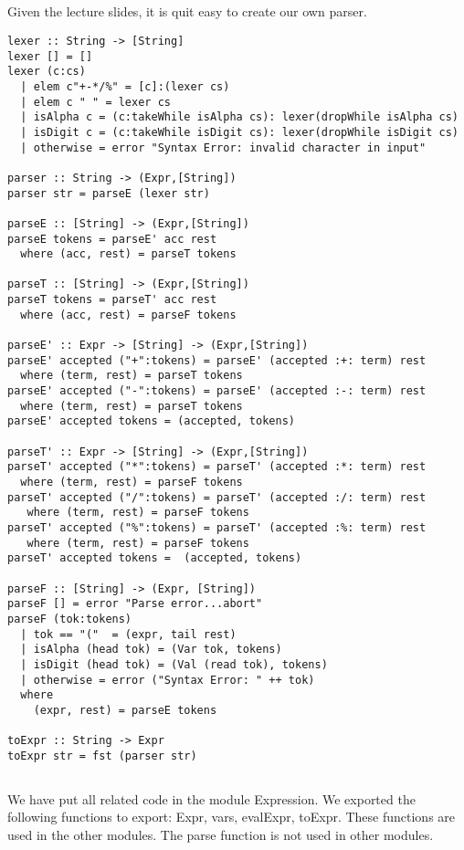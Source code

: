 \documentclass[a4paper,11pt]{article}
\begin{document}
\subsection{}
Given the lecture slides, it is quit easy to create our own parser. 

\begin{lstlisting}
lexer :: String -> [String]
lexer [] = []
lexer (c:cs)
  | elem c"+-*/%" = [c]:(lexer cs)
  | elem c " " = lexer cs
  | isAlpha c = (c:takeWhile isAlpha cs): lexer(dropWhile isAlpha cs)
  | isDigit c = (c:takeWhile isDigit cs): lexer(dropWhile isDigit cs)
  | otherwise = error "Syntax Error: invalid character in input"
  
parser :: String -> (Expr,[String])
parser str = parseE (lexer str)

parseE :: [String] -> (Expr,[String])
parseE tokens = parseE' acc rest
  where (acc, rest) = parseT tokens

parseT :: [String] -> (Expr,[String])
parseT tokens = parseT' acc rest
  where (acc, rest) = parseF tokens 

parseE' :: Expr -> [String] -> (Expr,[String])
parseE' accepted ("+":tokens) = parseE' (accepted :+: term) rest
  where (term, rest) = parseT tokens
parseE' accepted ("-":tokens) = parseE' (accepted :-: term) rest
  where (term, rest) = parseT tokens
parseE' accepted tokens = (accepted, tokens)

parseT' :: Expr -> [String] -> (Expr,[String])
parseT' accepted ("*":tokens) = parseT' (accepted :*: term) rest
  where (term, rest) = parseF tokens
parseT' accepted ("/":tokens) = parseT' (accepted :/: term) rest
   where (term, rest) = parseF tokens
parseT' accepted ("%":tokens) = parseT' (accepted :%: term) rest
   where (term, rest) = parseF tokens
parseT' accepted tokens =  (accepted, tokens)

parseF :: [String] -> (Expr, [String])
parseF [] = error "Parse error...abort"
parseF (tok:tokens)
  | tok == "("  = (expr, tail rest)
  | isAlpha (head tok) = (Var tok, tokens)
  | isDigit (head tok) = (Val (read tok), tokens)
  | otherwise = error ("Syntax Error: " ++ tok)
  where
    (expr, rest) = parseE tokens

toExpr :: String -> Expr
toExpr str = fst (parser str)
\end{lstlisting}

\subsection{}
We have put all related code in the module Expression. We exported the following functions to export: Expr, vars, evalExpr, toExpr. These functions are used in the other modules. The parse function is not used in other modules.
\end{document}
